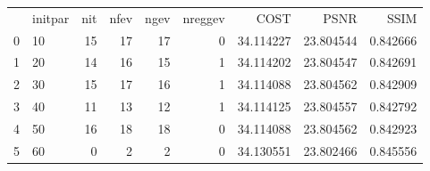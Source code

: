 \begin{tabular}{llrrrrrrr}
 & initpar & nit & nfev & ngev & nreggev & COST & PSNR & SSIM \\
0 & 10 & 15 & 17 & 17 & 0 & 34.114227 & 23.804544 & 0.842666 \\
1 & 20 & 14 & 16 & 15 & 1 & 34.114202 & 23.804547 & 0.842691 \\
2 & 30 & 15 & 17 & 16 & 1 & 34.114088 & 23.804562 & 0.842909 \\
3 & 40 & 11 & 13 & 12 & 1 & 34.114125 & 23.804557 & 0.842792 \\
4 & 50 & 16 & 18 & 18 & 0 & 34.114088 & 23.804562 & 0.842923 \\
5 & 60 & 0 & 2 & 2 & 0 & 34.130551 & 23.802466 & 0.845556 \\
\end{tabular}

